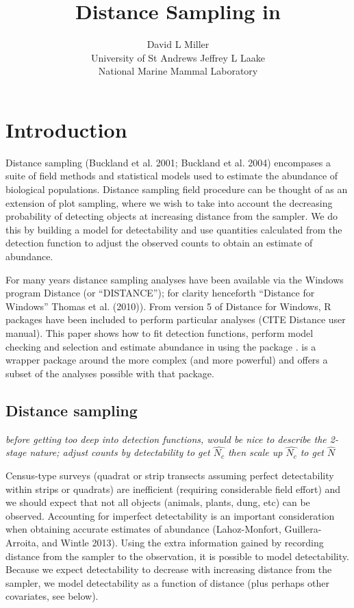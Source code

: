 \documentclass[article]{jss}
\author{
David L Miller\\University of St Andrews \And Jeffrey L Laake\\National Marine Mammal Laboratory
}
\title{Distance Sampling in \proglang{R}}
\begin{document}
\section{Introduction}\label{introduction}

Distance sampling (Buckland et al. 2001; Buckland et al. 2004)
encompases a suite of field methods and statistical models used to
estimate the abundance of biological populations. Distance sampling
field procedure can be thought of as an extension of plot sampling,
where we wish to take into account the decreasing probability of
detecting objects at increasing distance from the sampler. We do this by
building a model for detectability and use quantities calculated from
the detection function to adjust the observed counts to obtain an
estimate of abundance.

For many years distance sampling analyses have been available via the
Windows program Distance (or ``DISTANCE''); for clarity henceforth
``Distance for Windows'' Thomas et al. (2010)). From version 5 of
Distance for Windows, R packages have been included to perform
particular analyses (CITE Distance user manual). This paper shows how to
fit detection functions, perform model checking and selection and
estimate abundance in  using the package .
 is a wrapper package around the more complex (and more
powerful)  and offers a subset of the analyses possible with
that package.

\subsection{Distance sampling}\label{distance-sampling}

\emph{before getting too deep into detection functions, would be nice to
describe the 2-stage nature; adjust counts by detectability to get
\(\hat{N_c}\) then scale up \(\hat{N_c}\) to get \(\hat{N}\)}

Census-type surveys (quadrat or strip transects assuming perfect
detectability within strips or quadrats) are inefficient (requiring
considerable field effort) and we should expect that not all objects
(animals, plants, dung, etc) can be observed. Accounting for imperfect
detectability is an important consideration when obtaining accurate
estimates of abundance (Lahoz-Monfort, Guillera-Arroita, and Wintle
2013). Using the extra information gained by recording distance from the
sampler to the observation, it is possible to model detectability.
Because we expect detectability to decrease with increasing distance
from the sampler, we model detectability as a function of distance (plus
perhaps other covariates, see below).
\end{document}
